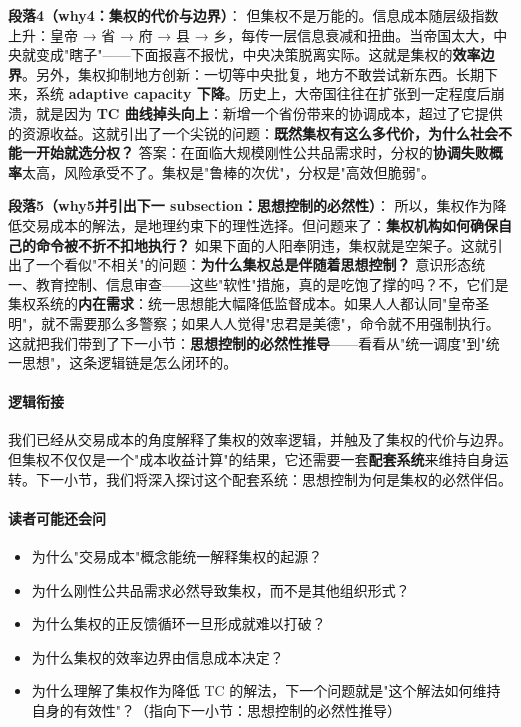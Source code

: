 \documentclass[../main.tex]{subfiles}
\begin{document}
	\textbf{段落4（why4：集权的代价与边界）}：  
	但集权不是万能的。信息成本随层级指数上升：皇帝 → 省 → 府 → 县 → 乡，每传一层信息衰减和扭曲。当帝国太大，中央就变成"瞎子"——下面报喜不报忧，中央决策脱离实际。这就是集权的\textbf{效率边界}。另外，集权抑制地方创新：一切等中央批复，地方不敢尝试新东西。长期下来，系统 \textbf{adaptive capacity 下降}。历史上，大帝国往往在扩张到一定程度后崩溃，就是因为 \textbf{TC 曲线掉头向上}：新增一个省份带来的协调成本，超过了它提供的资源收益。这就引出了一个尖锐的问题：\textbf{既然集权有这么多代价，为什么社会不能一开始就选分权？} 答案：在面临大规模刚性公共品需求时，分权的\textbf{协调失败概率}太高，风险承受不了。集权是"鲁棒的次优"，分权是"高效但脆弱"。
	
	\textbf{段落5（why5并引出下一 subsection：思想控制的必然性）}：  
	所以，集权作为降低交易成本的解法，是地理约束下的理性选择。但问题来了：\textbf{集权机构如何确保自己的命令被不折不扣地执行？} 如果下面的人阳奉阴违，集权就是空架子。这就引出了一个看似"不相关"的问题：\textbf{为什么集权总是伴随着思想控制？} 意识形态统一、教育控制、信息审查——这些"软性"措施，真的是吃饱了撑的吗？不，它们是集权系统的\textbf{内在需求}：统一思想能大幅降低监督成本。如果人人都认同"皇帝圣明"，就不需要那么多警察；如果人人觉得"忠君是美德"，命令就不用强制执行。这就把我们带到了下一小节：\textbf{思想控制的必然性推导}——看看从"统一调度"到"统一思想"，这条逻辑链是怎么闭环的。
	
	\paragraph*{逻辑衔接}
	我们已经从交易成本的角度解释了集权的效率逻辑，并触及了集权的代价与边界。但集权不仅仅是一个"成本收益计算"的结果，它还需要一套\textbf{配套系统}来维持自身运转。下一小节，我们将深入探讨这个配套系统：思想控制为何是集权的必然伴侣。
	
	\paragraph*{读者可能还会问}
	\begin{itemize}
\item 为什么"交易成本"概念能统一解释集权的起源？
	\item 为什么刚性公共品需求必然导致集权，而不是其他组织形式？
	\item 为什么集权的正反馈循环一旦形成就难以打破？
	\item 为什么集权的效率边界由信息成本决定？
	\item 为什么理解了集权作为降低 TC 的解法，下一个问题就是"这个解法如何维持自身的有效性"？（指向下一小节：思想控制的必然性推导）
\end{itemize}
	
\end{document}
